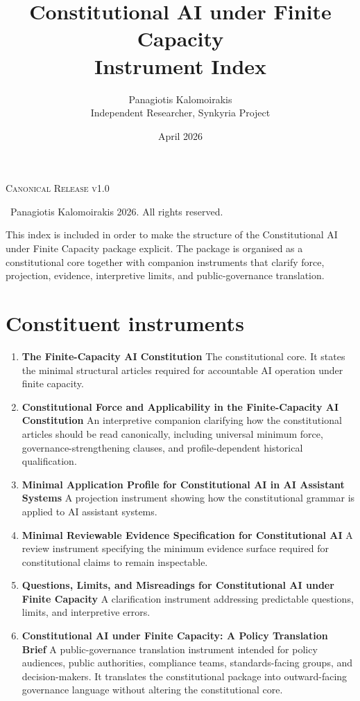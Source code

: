 \documentclass[11pt]{article}
\title{Constitutional AI under Finite Capacity\\
Instrument Index}
\author{Panagiotis Kalomoirakis\\
Independent Researcher, Synkyria Project}
\date{April 2026}
\begin{document}
\maketitle


\begin{center}
\small\textsc{Canonical Release v1.0}

\small \textcopyright\ Panagiotis Kalomoirakis 2026. All rights reserved.

\end{center}

\noindent This index is included in order to make the structure of the Constitutional AI under Finite Capacity package explicit. The package is organised as a constitutional core together with companion instruments that clarify force, projection, evidence, interpretive limits, and public-governance translation.

\section*{Constituent instruments}

\begin{enumerate}[leftmargin=2em]
    \item \textbf{The Finite-Capacity AI Constitution}  
    The constitutional core. It states the minimal structural articles required for accountable AI operation under finite capacity.

    \item \textbf{Constitutional Force and Applicability in the Finite-Capacity AI Constitution}  
    An interpretive companion clarifying how the constitutional articles should be read canonically, including universal minimum force, governance-strengthening clauses, and profile-dependent historical qualification.

    \item \textbf{Minimal Application Profile for Constitutional AI in AI Assistant Systems}  
    A projection instrument showing how the constitutional grammar is applied to AI assistant systems.

    \item \textbf{Minimal Reviewable Evidence Specification for Constitutional AI}  
    A review instrument specifying the minimum evidence surface required for constitutional claims to remain inspectable.

    \item \textbf{Questions, Limits, and Misreadings for Constitutional AI under Finite Capacity}  
    A clarification instrument addressing predictable questions, limits, and interpretive errors.

    \item \textbf{Constitutional AI under Finite Capacity: A Policy Translation Brief}  
    A public-governance translation instrument intended for policy audiences, public authorities, compliance teams, standards-facing groups, and decision-makers. It translates the constitutional package into outward-facing governance language without altering the constitutional core.
\end{enumerate}
\end{document}
